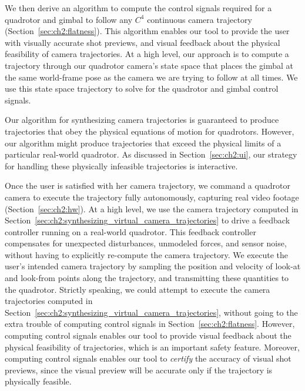 We then derive an algorithm to compute the control signals required for a quadrotor and gimbal to follow any $C^4$ continuous camera trajectory (Section~\ref{sec:ch2:flatness}).
This algorithm enables our tool to provide the user with visually accurate shot previews, and visual feedback about the physical feasibility of camera trajectories.
At a high level, our approach is to compute a trajectory through our quadrotor camera's state space that places the gimbal at the same world-frame pose as the camera we are trying to follow at all times.
We use this state space trajectory to solve for the quadrotor and gimbal control signals.

Our algorithm for synthesizing camera trajectories is guaranteed to produce trajectories that obey the physical equations of motion for quadrotors.
However, our algorithm might produce trajectories that exceed the physical limits of a particular real-world quadrotor.
As discussed in Section~\ref{sec:ch2:ui}, our strategy for handling these physically infeasible trajectories is interactive.

Once the user is satisfied with her camera trajectory, we command a quadrotor camera to execute the trajectory fully autonomously, capturing real video footage (Section~\ref{sec:ch2:hw}).
At a high level, we use the camera trajectory computed in Section~\ref{sec:ch2:synthesizing_virtual_camera_trajectories} to drive a feedback controller running on a real-world quadrotor.
This feedback controller compensates for unexpected disturbances, unmodeled forces, and sensor noise, without having to explicitly re-compute the camera trajectory.
We execute the user's intended camera trajectory by sampling the position and velocity of look-at and look-from points along the trajectory, and transmitting these quantities to the quadrotor.
Strictly speaking, we could attempt to execute the camera trajectories computed in Section~\ref{sec:ch2:synthesizing_virtual_camera_trajectories}, without going to the extra trouble of  computing control signals  in Section~\ref{sec:ch2:flatness}.
However, computing control signals enables our tool to provide visual feedback about the physical feasibility of trajectories, which is an important safety feature. Moreover, computing control signals enables our tool to \emph{certify} the accuracy of visual shot previews, since the visual preview will be accurate only if the trajectory is physically feasible.

